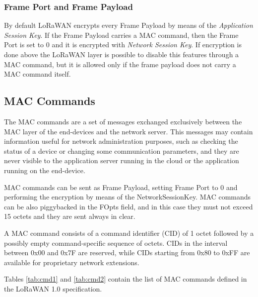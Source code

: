 \subsubsection{Frame Port and Frame Payload}
By default LoRaWAN encrypts every Frame Payload by means of the \emph{Application Session Key}. If the Frame Payload carries a MAC command, then the Frame Port is set to 0 and it is encrypted with \emph{Network Session Key}.
If encryption is done above the LoRaWAN layer is possible to disable this features through a MAC command, but it is allowed only if the frame payload does not carry a MAC command itself.



\subsection{MAC Commands}
The MAC commands are a set of messages exchanged exclusively between the MAC layer of the end-devices and the network server. This messages may contain information useful for network administration purposes, such as checking the status of a device or changing some communication parameters, and they are never visible to the application server running in the cloud or the application running on the end-device.

MAC commands can be sent as Frame Payload, setting Frame Port to 0 and performing the encryption by means of the NetworkSessionKey. MAC commands can be also piggybacked in the FOpts field, and in this case they must not exceed 15 octets and they are sent always in clear.

A MAC command consists of a command identifier (CID) of 1 octet followed by a possibly empty command-specific sequence of octets. CIDs in the interval between 0x00 and 0x7F are reserved, while CIDs starting from 0x80 to 0xFF are available for proprietary network extensions.

Tables \ref{tab:cmd1} and \ref{tab:cmd2} contain the list of MAC commands defined in the LoRaWAN 1.0 specification.


